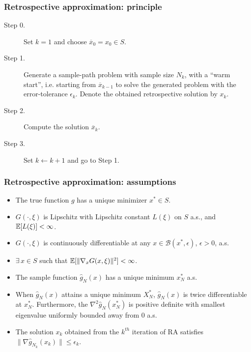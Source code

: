 \documentclass[aspectratio=169]{beamer}
\def\cB{\mathcal{B}}
\begin{document}
\begin{frame}
\frametitle{Retrospective approximation: principle}

\begin{description}
\item[Step 0.]
Set $k = 1$ and choose $\overline{x}_0 = x_0 \in S$.
\item[Step 1.]
Generate a sample-path problem with sample size $N_k$, with a ``warm start'', i.e. starting from $\overline{x}_{k-1}$ %
to solve the generated problem with the error-tolerance $\epsilon_k$.
Denote the obtained retrospective solution by $x_k$.
\item[Step 2.]
Compute the solution $\overline{x}_k$.
\item[Step 3.]
Set $k \leftarrow k + 1$ and go to Step 1.
\end{description}

\end{frame}

\begin{frame}
\frametitle{Retrospective approximation: assumptions}

\begin{itemize}
\item
The true function $g$ has a unique minimizer $x^* \in S$.
\item
$G(\cdot,\xi)$ is Lipschitz with Lipschitz constant $L(\xi)$ on $S$ a.s., and ${\mathbb{E}}[L(\xi)] < \infty$.
\item
$G(\cdot,\xi)$ is continuously differentiable at any $x \in \cB(x^*, \epsilon)$, $\epsilon > 0$, a.s.
\item
$\exists\, x \in S$ such that ${\mathbb{E}}[\|\nabla_x G(x,\xi)\|^2] < \infty$.
\item
The sample function $\hat{g}_N(x)$ has a unique minimum $x_N^*$ a.s.
\item
When $\hat{g}_N(x)$ attains a unique minimum $X_N^*$, $\hat{g}_N(x)$ is twice differentiable at $x_N^*$.
Furthermore, the $\nabla^2 \hat{g}_N (x_N^*)$ is positive definite with smallest eigenvalue uniformly bounded away from 0 a.s.
\item
The solution $x_k$ obtained from the $k^{th}$ iteration of RA satisfies $\| \nabla \hat{g}_{N_k}(x_k) \| \leq \epsilon_k$.
\end{itemize}

\end{frame}
\end{document}
